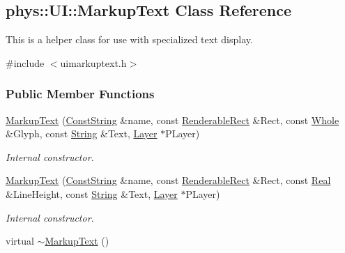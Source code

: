 \hypertarget{classphys_1_1UI_1_1MarkupText}{
\subsection{phys::UI::MarkupText Class Reference}
\label{classphys_1_1UI_1_1MarkupText}
}


This is a helper class for use with specialized text display.  




{\ttfamily \#include $<$uimarkuptext.h$>$}

\subsubsection*{Public Member Functions}
\begin{DoxyCompactItemize}
\item 
\hyperlink{classphys_1_1UI_1_1MarkupText_aeb1fe3a0dd2a996bf50bd4c695d1af94}{MarkupText} (\hyperlink{namespacephys_a5ce5049f8b4bf88d6413c47b504ebb31}{ConstString} \&name, const \hyperlink{structphys_1_1UI_1_1RenderableRect}{RenderableRect} \&Rect, const \hyperlink{namespacephys_a460f6bc24c8dd347b05e0366ae34f34a}{Whole} \&Glyph, const \hyperlink{namespacephys_aa03900411993de7fbfec4789bc1d392e}{String} \&Text, \hyperlink{classphys_1_1UI_1_1Layer}{Layer} $\ast$PLayer)
\begin{DoxyCompactList}\small\item\em Internal constructor. \item\end{DoxyCompactList}\item 
\hyperlink{classphys_1_1UI_1_1MarkupText_a9050a1cdd940e80023744a8476a78f21}{MarkupText} (\hyperlink{namespacephys_a5ce5049f8b4bf88d6413c47b504ebb31}{ConstString} \&name, const \hyperlink{structphys_1_1UI_1_1RenderableRect}{RenderableRect} \&Rect, const \hyperlink{namespacephys_af7eb897198d265b8e868f45240230d5f}{Real} \&LineHeight, const \hyperlink{namespacephys_aa03900411993de7fbfec4789bc1d392e}{String} \&Text, \hyperlink{classphys_1_1UI_1_1Layer}{Layer} $\ast$PLayer)
\begin{DoxyCompactList}\small\item\em Internal constructor. \item\end{DoxyCompactList}\item 
\hypertarget{classphys_1_1UI_1_1MarkupText_a7c5d8033801123c938089ef9ca647f01}{
virtual \hyperlink{classphys_1_1UI_1_1MarkupText_a7c5d8033801123c938089ef9ca647f01}{$\sim$MarkupText} ()}
\label{classphys_1_1UI_1_1MarkupText_a7c5d8033801123c938089ef9ca647f01}


\end{DoxyCompactItemize}
